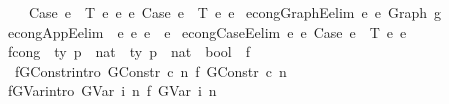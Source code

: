\begin{isabellebody}
\ \ \ \ Case\ e{}\ {\isasymGamma}\ T\ e{}\ e{}\ {\isasymsimeq}e\ Case\ e{}{\isacharprime}{\kern0pt}\ {\isasymGamma}\ T\ e{}{\isacharprime}{\kern0pt}\ e{}{\isacharprime}{\kern0pt}{\isachardoublequoteclose}\isanewline
\isanewline
\isanewline
{}\isamarkupfalse%
\ econg{\isacharunderscore}{\kern0pt}GraphE{\isacharbrackleft}{\kern0pt}elim{\isacharbang}{\kern0pt}{\isacharbrackright}{\kern0pt}{\isacharcolon}{\kern0pt}\ {\isachardoublequoteopen}e\ {\isasymsimeq}e\ Graph\ g{\isachardoublequoteclose}\isanewline
{}\isamarkupfalse%
\ econg{\isacharunderscore}{\kern0pt}AppE{\isacharbrackleft}{\kern0pt}elim{\isacharbang}{\kern0pt}{\isacharbrackright}{\kern0pt}{\isacharcolon}{\kern0pt}\ \ {\isachardoublequoteopen}e\ {\isasymsimeq}e\ e{}\ {\isasymcdot}\ e{}{\isachardoublequoteclose}\isanewline
{}\isamarkupfalse%
\ econg{\isacharunderscore}{\kern0pt}CaseE{\isacharbrackleft}{\kern0pt}elim{\isacharbang}{\kern0pt}{\isacharbrackright}{\kern0pt}{\isacharcolon}{\kern0pt}\ {\isachardoublequoteopen}e\ {\isasymsimeq}e\ Case\ e{}\ {\isasymGamma}\ T\ e{}\ e{}{\isachardoublequoteclose}\isanewline
\isanewline
\isanewline
{}\isamarkupfalse%
\ fcong\ {\isacharcolon}{\kern0pt}{\isacharcolon}{\kern0pt}\ {\isachardoublequoteopen}{\isacharparenleft}{\kern0pt}{\isacharprime}{\kern0pt}ty\ p\ {\isacharasterisk}{\kern0pt}\ nat{\isacharparenright}{\kern0pt}\ {\isacharequal}{\kern0pt}{\isachargreater}{\kern0pt}\ {\isacharparenleft}{\kern0pt}{\isacharprime}{\kern0pt}ty\ p\ {\isacharasterisk}{\kern0pt}\ nat{\isacharparenright}{\kern0pt}\ {\isacharequal}{\kern0pt}{\isachargreater}{\kern0pt}\ bool{\isachardoublequoteclose}\ {\isacharparenleft}{\kern0pt}\ {\isachardoublequoteopen}{\isasymsimeq}f{\isachardoublequoteclose}\ {}{}{\isacharparenright}{\kern0pt}\ \isanewline
\ \ f{\isacharunderscore}{\kern0pt}GConstr{\isacharbrackleft}{\kern0pt}intro{\isacharbrackright}{\kern0pt}{\isacharcolon}{\kern0pt}\ {\isachardoublequoteopen}{\isacharparenleft}{\kern0pt}GConstr\ c{\isacharcomma}{\kern0pt}\ n{\isacharparenright}{\kern0pt}\ {\isasymsimeq}f\ {\isacharparenleft}{\kern0pt}GConstr\ c{\isacharcomma}{\kern0pt}\ n{\isacharparenright}{\kern0pt}{\isachardoublequoteclose}\isanewline
{\isacharbar}{\kern0pt}\ f{\isacharunderscore}{\kern0pt}GVar{\isacharbrackleft}{\kern0pt}intro{\isacharbrackright}{\kern0pt}{\isacharcolon}{\kern0pt}\ {\isachardoublequoteopen}{\isacharparenleft}{\kern0pt}GVar\ i{\isacharcomma}{\kern0pt}\ n{\isacharparenright}{\kern0pt}\ {\isasymsimeq}f\ {\isacharparenleft}{\kern0pt}GVar\ i{\isacharcomma}{\kern0pt}\ n{\isacharparenright}{\kern0pt}{\isachardoublequoteclose}\isanewline

\end{isabellebody}

